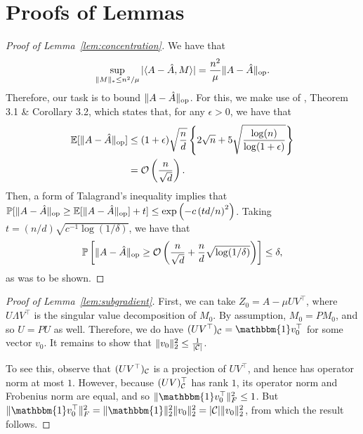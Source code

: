 \documentclass[11pt]{article}
\newcommand{\A}{\hat{A}}
\newcommand{\oo}{\mathcal{O}}
\newcommand{\bi}{\mathbbm{1}}
\begin{document}
\section{Proofs of Lemmas}
\label{sec:lemma-proofs}

\begin{proof}[Proof of Lemma~\ref{lem:concentration}]
We have that 
\[ \sup_{\|M\|_* \leq n^2/\mu} |\langle A-\A, M \rangle| = \frac{n^2}{\mu}\|A-\A\|_{\op}. \]
Therefore, our task is to bound $\|A-\A\|_{\op}$. For this, we make use of \citet{bandeira2014sharp}, 
Theorem 3.1 \& Corollary 3.2, which states that, for any $\epsilon > 0$, we have that
\begin{align}
\bE[\|A-\A\|_{\op}] &\leq (1+\epsilon)\sqrt{\frac{n}{d}}\left\{2\sqrt{n} + 5\sqrt{\frac{\log(n)}{\log(1+\epsilon)}}\right\} \\
 &= \oo\p{\frac{n}{\sqrt{d}}}.
\end{align}
Then, a form of Talagrand's inequality implies that
$\bP[\|A-\A\|_{\op} \geq \bE[\|A-\A\|_{\op}] + t] \leq \exp\p{-c\p{td/n}^2}$. 
Taking $t = (n/d)\sqrt{c^{-1}\log(1/\delta)}$, we have that 
\[ \bP\left[\|A-\A\|_{\op} \geq \oo\p{\frac{n}{\sqrt{d}} + \frac{n}{d}\sqrt{\log(1/\delta)}}\right] \leq \delta, \]
as was to be shown.
\end{proof}

\begin{proof}[Proof of Lemma~\ref{lem:subgradient}]
First, we can take $Z_0 = A - \mu UV^{\top}$, where $U \Lambda V^{\top}$ is the singular 
value decomposition of $M_0$. By assumption, $M_0 = PM_0$, and so $U = PU$ as well. Therefore, 
we do have $(UV^{\top})_{\sC} = \bi v_0^{\top}$ for some vector $v_0$. It remains to show that 
$\|v_0\|_2^2 \leq \frac{1}{|\mathcal{C}|}$.

To see this, observe that $(UV^{\top})_{\mathcal{C}}$ is a projection of $UV^{\top}$, and hence 
has operator norm at most $1$. However, because $(UV)^{\top}_{\mathcal{C}}$ has rank $1$, its 
operator norm and Frobenius norm are equal, and so $\|\bi v_0^{\top}\|_F^2 \leq 1$. 
But $\|\bi v_0^{\top}\|_F^2 = \|\bi\|_2^2\|v_0\|_2^2 = |\sC|\|v_0\|_2^2$, from which 
the result follows.
\end{proof}



\end{document}
